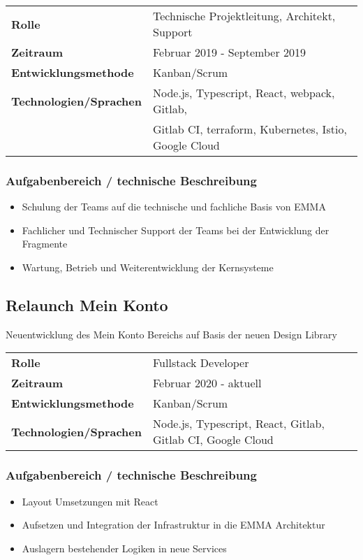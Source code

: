 \documentclass[10pt,ngerman,a4paper]{article}
\begin{document}
\begin{tabular}{ll}
\textbf{Rolle} & Technische Projektleitung, Architekt, Support \\
\textbf{Zeitraum} & Februar 2019 - September 2019\\
\textbf{Entwicklungsmethode} & Kanban/Scrum\\
\textbf{Technologien/Sprachen} & Node.js, Typescript, React, webpack, Gitlab,\\
& Gitlab CI, terraform, Kubernetes, Istio, Google Cloud
\end{tabular}

\subsubsection{Aufgabenbereich / technische Beschreibung}
\begin{itemize}
\item Schulung der Teams auf die technische und fachliche Basis von EMMA
\item Fachlicher und Technischer Support der Teams bei der Entwicklung der Fragmente
\item Wartung, Betrieb und Weiterentwicklung der Kernsysteme
\end{itemize}

\subsection{Relaunch Mein Konto}
Neuentwicklung des Mein Konto Bereichs auf Basis der neuen Design Library

\begin{tabular}{ll}
\textbf{Rolle} & Fullstack Developer \\
\textbf{Zeitraum} & Februar 2020 - aktuell\\
\textbf{Entwicklungsmethode} & Kanban/Scrum\\
\textbf{Technologien/Sprachen} & Node.js, Typescript, React, Gitlab, Gitlab CI, Google Cloud
\end{tabular}

\subsubsection{Aufgabenbereich / technische Beschreibung}
\begin{itemize}
\item Layout Umsetzungen mit React
\item Aufsetzen und Integration der Infrastruktur in die EMMA Architektur
\item Auslagern bestehender Logiken in neue Services
\end{itemize}
\end{document}
